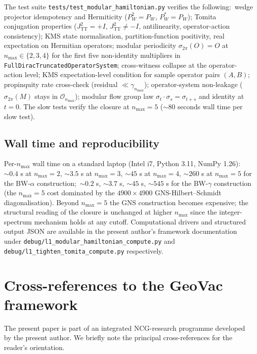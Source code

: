 \documentclass[11pt,a4paper]{article}
\theoremstyle{plain}
\theoremstyle{definition}
\newcommand{\nmax}{n_{\max}}
\newcommand{\Op}{\mathcal{O}}
\newcommand{\TT}{\mathrm{TT}}
\begin{document}
The test suite \verb|tests/test_modular_hamiltonian.py| verifies the
following:\ wedge projector idempotency and Hermiticity ($P_W^2 =
P_W$, $P_W^* = P_W$); Tomita conjugation properties ($J_{\TT}^2 = +I$,
$J_{\TT}^2 \ne -I$, antilinearity, operator-action consistency); KMS
state normalisation, partition-function positivity, real expectation
on Hermitian operators; modular periodicity $\sigma_{2\pi}(O) = O$ at
$\nmax \in \{2, 3, 4\}$ for the first five non-identity multipliers in
\verb|FullDiracTruncatedOperatorSystem|; cross-witness collapse at
the operator-action level; KMS expectation-level condition for sample
operator pairs $(A, B)$; propinquity rate cross-check
(residual $\ll \gamma_{\nmax}$); operator-system non-leakage
($\sigma_{2\pi}(M)$ stays in $\Op_{\nmax}$); modular flow group law
$\sigma_t \cdot \sigma_s = \sigma_{t+s}$ and identity at $t = 0$. The
slow tests verify the closure at $\nmax = 5$ ($\sim$80 seconds wall
time per slow test).

\subsection{Wall time and reproducibility}\label{sec:wall_time}

Per-$\nmax$ wall time on a standard laptop (Intel i7, Python 3.11,
NumPy 1.26):\ $\sim 0.4$ s at $\nmax = 2$, $\sim 3.5$ s at $\nmax = 3$,
$\sim 45$ s at $\nmax = 4$, $\sim 260$ s at $\nmax = 5$ for the
BW-$\alpha$ construction;\ $\sim 0.2$ s, $\sim 3.7$ s, $\sim 45$ s,
$\sim 545$ s for the BW-$\gamma$ construction (the $\nmax = 5$ cost
dominated by the $4900 \times 4900$ GNS-Hilbert--Schmidt
diagonalisation). Beyond $\nmax = 5$ the GNS construction becomes
expensive; the structural reading of the closure is unchanged at
higher $\nmax$ since the integer-spectrum mechanism holds at any
cutoff. Computational drivers and structured output JSON are
available in the present author's framework documentation under
\verb|debug/l1_modular_hamiltonian_compute.py| and
\verb|debug/l1_tighten_tomita_compute.py| respectively.

\section{Cross-references to the GeoVac framework}
\label{app:framework_crossref}

The present paper is part of an integrated NCG-research programme
developed by the present author. We briefly note the principal
cross-references for the reader's orientation.
\end{document}

